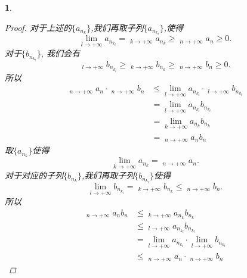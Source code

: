 \documentclass[utf8]{book}
\newtheorem{example}{}[section]             %
\DeclareMathOperator*\lowlim{\underline{lim}}
\DeclareMathOperator*\uplim{\overline{lim}}
\begin{document}
\begin{example}
\begin{enumerate}
\begin{proof}
对于上述的$\{a_{n_k}\}$,我们再取子列$\{a_{n_{k_l}}\}$,使得
$$\displaystyle\lim_{l\to +\infty}a_{n_{k_l}}=\displaystyle\lowlim_{k\to +\infty}a_{n_k}\geq \displaystyle\lowlim_{n\to +\infty}a_n \geq 0.$$
对于$\{b_{n_{k_l}}\}$, 我们会有
$$\displaystyle\lowlim_{l\to +\infty}b_{n_{k_l}}\geq \displaystyle\lowlim_{k\to +\infty}b_{n_k}\geq \displaystyle\lowlim_{n\to +\infty}b_n \geq 0.$$
所以
\begin{equation*}
\begin{split}
\displaystyle\lowlim_{n\to +\infty}a_n\cdot \displaystyle\lowlim_{n\to +\infty}b_n &\leq \displaystyle\lim_{l\to +\infty}a_{n_{k_l}}\cdot \displaystyle\lowlim_{l\to +\infty}b_{n_{k_l}} \\&= \displaystyle\lim_{l\to +\infty}a_{n_{k_l}}b_{n_{k_l}} \\&= \displaystyle\lim_{k\to +\infty}a_{n_k}b_{n_k} \\&=
\displaystyle\lowlim_{n\to +\infty}a_nb_n 
\end{split}
\end{equation*}
取$\{a_{n_k}\}$使得
$$\displaystyle\lim_{k\to +\infty}a_{n_k}=\displaystyle\lowlim_{n\to +\infty}a_n.$$
对于对应的子列$\{b_{n_k}\}$,我们再取子列$\{b_{n_{k_l}}\}$使得
$$\displaystyle\lim_{l\to +\infty}b_{n_{k_l}} = \displaystyle\uplim_{k\to +\infty}b_{n_k} \leq \displaystyle\uplim_{n\to +\infty}b_n.$$
所以
\begin{equation*}
\begin{split}
\displaystyle\lowlim_{n\to +\infty}a_nb_n &\leq \displaystyle\lowlim_{k\to +\infty}a_{n_k}b_{n_k}\\
&\leq \displaystyle\lowlim_{l\to +\infty}a_{n_{k_l}}b_{n_{k_l}} \\&= \displaystyle\lim_{l\to +\infty}a_{n_{k_l}}\cdot \displaystyle\lim_{l\to +\infty}b_{n_{k_l}} \\&\leq \displaystyle\lowlim_{n\to +\infty}a_n\cdot\displaystyle\uplim_{n\to +\infty}b_n
\end{split}
\end{equation*}


\end{proof}
\end{enumerate}
\end{example}
\end{document}
